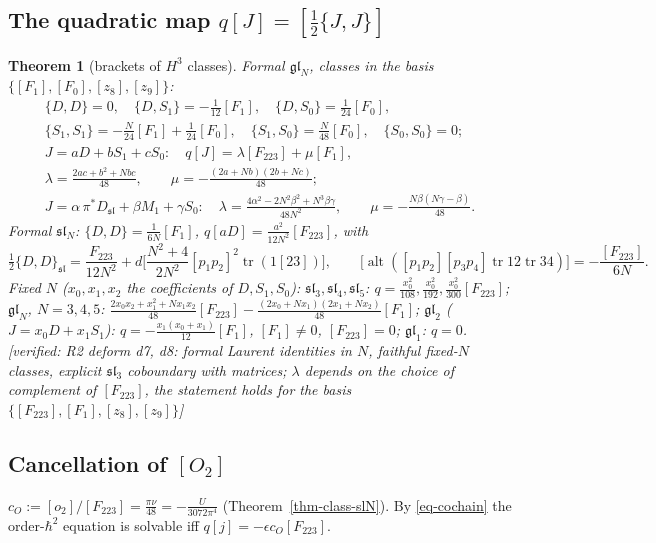 \documentclass[10pt,a4paper]{article}
\numberwithin{equation}{section}
\newtheorem{theorem}{Theorem}[section]
\theoremstyle{definition}
\theoremstyle{remark}
\newcommand{\tr}{\operatorname{tr}}
\newcommand{\alt}{\operatorname{alt}}
\newcommand{\fsl}{\mathfrak{sl}}
\newcommand{\fgl}{\mathfrak{gl}}
\newcommand{\ver}[1]{\textup{[verified: #1]}}
\begin{document}
\subsection{\texorpdfstring{The quadratic map $q[J]=[\frac12\{J,J\}]$}{The quadratic map q}}

\begin{theorem}[brackets of $H^3$ classes]\label{thm-quad}
Formal $\fgl_N$, classes in the basis $\{[F_1],[F_0],[z_8],[z_9]\}$:
\begin{gather}
\{D,D\}=0,\quad\{D,S_1\}=-\tfrac1{12}[F_1],\quad\{D,S_0\}=\tfrac1{24}[F_0],\\
\{S_1,S_1\}=-\tfrac N{24}[F_1]+\tfrac1{24}[F_0],\quad\{S_1,S_0\}=\tfrac N{48}[F_0],\quad\{S_0,S_0\}=0;\\
J=aD+bS_1+cS_0:\quad q[J]=\lambda[F_{223}]+\mu[F_1],\\
\lambda=\frac{2ac+b^2+Nbc}{48},\qquad \mu=-\frac{(2a+Nb)(2b+Nc)}{48};\\
J=\alpha\,\pi^*D_{\fsl}+\beta M_1+\gamma S_0:\quad \lambda=\frac{4\alpha^2-2N^2\beta^2+N^3\beta\gamma}{48N^2},\qquad \mu=-\frac{N\beta(N\gamma-\beta)}{48}.
\end{gather}
Formal $\fsl_N$: $\{D,D\}=\frac1{6N}[F_1]$, $q[aD]=\frac{a^2}{12N^2}[F_{223}]$, with
\begin{equation}
\tfrac12\{D,D\}_{\fsl}=\frac{F_{223}}{12N^2}+d\Big[\frac{N^2+4}{2N^2}[p_1p_2]^2\tr(1[23])\Big],\qquad \big[\alt([p_1p_2][p_3p_4]\tr12\tr34)\big]=-\frac{[F_{223}]}{6N}.
\end{equation}
Fixed $N$ ($x_0,x_1,x_2$ the coefficients of $D,S_1,S_0$): $\fsl_3,\fsl_4,\fsl_5$: $q=\frac{x_0^2}{108},\frac{x_0^2}{192},\frac{x_0^2}{300}[F_{223}]$; $\fgl_N$, $N=3,4,5$: $\frac{2x_0x_2+x_1^2+Nx_1x_2}{48}[F_{223}]-\frac{(2x_0+Nx_1)(2x_1+Nx_2)}{48}[F_1]$; $\fgl_2$ ($J=x_0D+x_1S_1$): $q=-\frac{x_1(x_0+x_1)}{12}[F_1]$, $[F_1]\ne0$, $[F_{223}]=0$; $\fgl_1$: $q=0$.
\ver{R2 deform d7, d8: formal Laurent identities in $N$, faithful fixed-$N$ classes, explicit $\fsl_3$ coboundary with matrices; $\lambda$ depends on the choice of complement of $[F_{223}]$, the statement holds for the basis $\{[F_{223}],[F_1],[z_8],[z_9]\}$}
\end{theorem}

\subsection{\texorpdfstring{Cancellation of $[O_2]$}{Cancellation of [O2]}}

$c_O:=[o_2]/[F_{223}]=\frac{\pi\nu}{48}=-\frac{U}{3072\pi^4}$ (Theorem~\ref{thm-class-slN}). By \eqref{eq-cochain} the order-$\hbar^2$ equation is solvable iff $q[j]=-\epsilon c_O[F_{223}]$.
\end{document}
